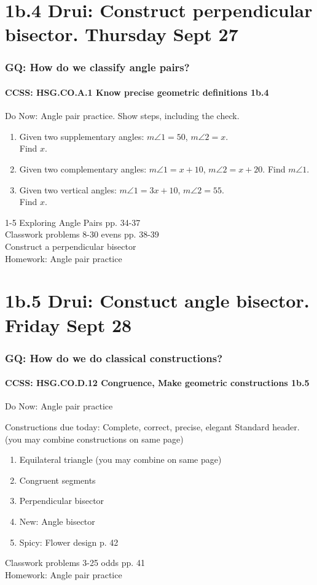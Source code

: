 \documentclass{beamer}
\begin{document}
\section{1b.4 Drui: Construct perpendicular bisector. Thursday Sept 27}
  \frame
  {
    \frametitle{GQ: How do we classify angle pairs?}
    \framesubtitle{CCSS: HSG.CO.A.1 Know precise geometric definitions  \alert{1b.4}}

    \begin{block}{Do Now: Angle pair practice. Show steps, including the check.}
    \begin{enumerate}
        \item Given two supplementary angles: $m \angle 1 = 50$, $m \angle 2 = x$.\\ Find $x$.
        \item Given two complementary angles: $m \angle 1 = x+10$, $m \angle 2 = x+20$. Find $m \angle 1$.
        \item Given two vertical angles: $m \angle 1 = 3x+10$, $m \angle 2 = 55$.\\ Find $x$.
    \end{enumerate}
    \end{block}
    1-5 Exploring Angle Pairs pp. 34-37\\
    Classwork problems 8-30 evens pp. 38-39\\
    Construct a perpendicular bisector \\
    \vspace{0.2cm}
    Homework: Angle pair practice
  }

\section{1b.5 Drui: Constuct angle bisector. Friday Sept 28}
  \frame
  {
    \frametitle{GQ: How do we do classical constructions?}
    \framesubtitle{CCSS: HSG.CO.D.12 Congruence, Make geometric constructions  \alert{1b.5}}
    Do Now: Angle pair practice
    \begin{block}{Constructions due today: Complete, correct, precise, elegant}
      Standard header. (you may combine constructions on same page)
      \begin{enumerate}
          \item Equilateral triangle (you may combine on same page)
          \item Congruent segments
          \item Perpendicular bisector
          \item New: Angle bisector
          \item Spicy: Flower design p. 42
      \end{enumerate}
    \end{block}
    Classwork problems 3-25 odds pp. 41\\
    \vspace{0.5cm}
    Homework: Angle pair practice
  }
\end{document}
